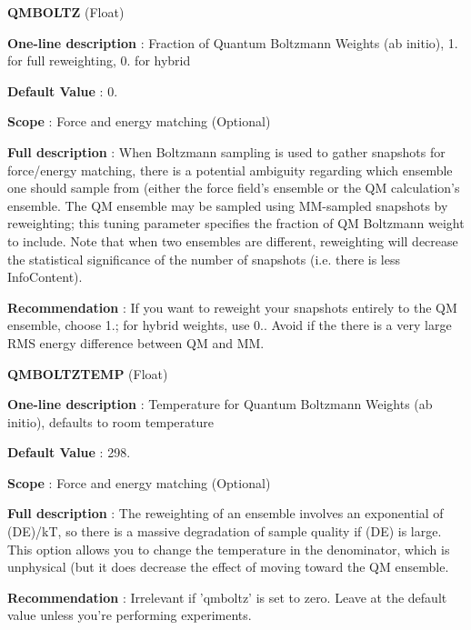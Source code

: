 \begin{DoxyItemize}
\item {\bfseries  Q\-M\-B\-O\-L\-T\-Z } (Float) \par
{\bfseries  One-\/line description }\-: Fraction of Quantum Boltzmann Weights (ab initio), 1. for full reweighting, 0. for hybrid \par
{\bfseries  Default Value }\-: 0. \par
{\bfseries  Scope }\-: Force and energy matching (Optional) \par
{\bfseries  Full description }\-: When Boltzmann sampling is used to gather snapshots for force/energy matching, there is a potential ambiguity regarding which ensemble one should sample from (either the force field's ensemble or the Q\-M calculation's ensemble. The Q\-M ensemble may be sampled using M\-M-\/sampled snapshots by reweighting; this tuning parameter specifies the fraction of Q\-M Boltzmann weight to include. Note that when two ensembles are different, reweighting will decrease the statistical significance of the number of snapshots (i.\-e. there is less Info\-Content). \par
{\bfseries  Recommendation }\-: If you want to reweight your snapshots entirely to the Q\-M ensemble, choose 1.; for hybrid weights, use 0.. Avoid if the there is a very large R\-M\-S energy difference between Q\-M and M\-M.\end{DoxyItemize}
\begin{DoxyItemize}
\item {\bfseries  Q\-M\-B\-O\-L\-T\-Z\-T\-E\-M\-P } (Float) \par
{\bfseries  One-\/line description }\-: Temperature for Quantum Boltzmann Weights (ab initio), defaults to room temperature \par
{\bfseries  Default Value }\-: 298. \par
{\bfseries  Scope }\-: Force and energy matching (Optional) \par
{\bfseries  Full description }\-: The reweighting of an ensemble involves an exponential of (D\-E)/k\-T, so there is a massive degradation of sample quality if (D\-E) is large. This option allows you to change the temperature in the denominator, which is unphysical (but it does decrease the effect of moving toward the Q\-M ensemble. \par
{\bfseries  Recommendation }\-: Irrelevant if 'qmboltz' is set to zero. Leave at the default value unless you're performing experiments.\end{DoxyItemize}
